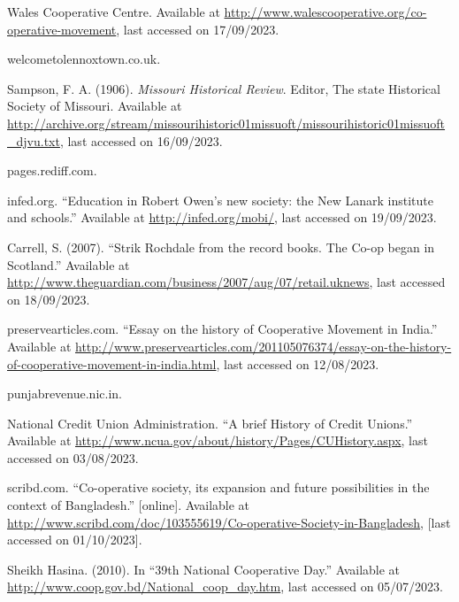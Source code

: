 
\begin{thebibliography}{9}

    Wales Cooperative Centre. Available at \url{http://www.walescooperative.org/co-operative-movement}, last accessed on 17/09/2023.
    
    welcometolennoxtown.co.uk. 
    
    Sampson, F. A. (1906). \textit{Missouri Historical Review}. Editor, The state Historical Society of Missouri. Available at \url{http://archive.org/stream/missourihistoric01missuoft/missourihistoric01missuoft_djvu.txt}, last accessed on 16/09/2023.
    
    pages.rediff.com.
    
    infed.org. ``Education in Robert Owen’s new society: the New Lanark institute and schools.'' Available at \url{http://infed.org/mobi/}, last accessed on 19/09/2023.
    
    Carrell, S. (2007). ``Strik Rochdale from the record books. The Co-op began in Scotland.'' Available at \url{http://www.theguardian.com/business/2007/aug/07/retail.uknews}, last accessed on 18/09/2023.
    
    preservearticles.com. ``Essay on the history of Cooperative Movement in India.'' Available at \url{http://www.preservearticles.com/201105076374/essay-on-the-history-of-cooperative-movement-in-india.html}, last accessed on 12/08/2023.
    
    punjabrevenue.nic.in.
    
    National Credit Union Administration. ``A brief History of Credit Unions.'' Available at \url{http://www.ncua.gov/about/history/Pages/CUHistory.aspx}, last accessed on 03/08/2023.
    
    scribd.com. ``Co-operative society, its expansion and future possibilities in the context of Bangladesh.'' [online]. Available at \url{http://www.scribd.com/doc/103555619/Co-operative-Society-in-Bangladesh}, [last accessed on 01/10/2023].
    
    Sheikh Hasina. (2010). In ``39th National Cooperative Day.'' Available at \url{http://www.coop.gov.bd/National_coop_day.htm}, last accessed on 05/07/2023.
    

\end{thebibliography}
